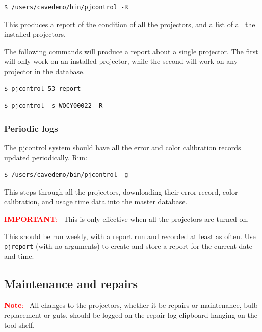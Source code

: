 \documentclass[11pt]{article}
\newenvironment{note}[1][Note]{\begin{lrbox}{\notebox}%
    \begin{minipage}{0.9\columnwidth}\textcolor{red}{\textbf{#1}:~}}%
    {\end{minipage}\end{lrbox}\begin{center}\setlength{\fboxsep}{8pt}%
    \fbox{\usebox{\notebox}}\end{center}}
\newcommand{\cmd}[1]{\texttt{#1}\xspace}
\begin{document}
\begin{verbatim}
$ /users/cavedemo/bin/pjcontrol -R
\end{verbatim}

This produces a report of the condition of all the projectors, and a
list of all the installed projectors.

The following commands will produce a report about a single
projector.  The first will only work on an installed projector, while
the second will work on any projector in the database.

\begin{verbatim}
$ pjcontrol 53 report
\end{verbatim}

\begin{verbatim}
$ pjcontrol -s WOCY00022 -R
\end{verbatim}

\subsubsection{Periodic logs}

The pjcontrol system should have all the error and color calibration
records updated periodically.  Run:

\begin{verbatim}
$ /users/cavedemo/bin/pjcontrol -g
\end{verbatim}

This steps through all the projectors, downloading their error
record, color calibration, and usage time data into the master
database.

\begin{note}[IMPORTANT]
This is only effective when all the projectors are turned on.
\end{note}

This should be run weekly, with a report run and recorded at least as
often.  Use \cmd{pjreport} (with no arguments) to create and store a
report for the current date and time.

\subsection{Maintenance and repairs}

\begin{note}[Note]
All changes to the projectors, whether it be repairs or maintenance,
bulb replacement or guts, should be logged on the repair log clipboard
hanging on the tool shelf.
\end{note}
\end{document}
